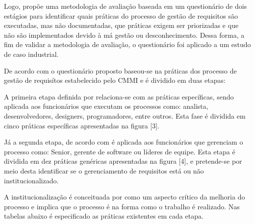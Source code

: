 Logo, \cite{cuevas2004assessment} propõe
uma metodologia de avaliação baseada em um questionário de dois estágios para identificar quais práticas do processo de gestão de requisitos são executadas, mas não documentadas, que práticas exigem ser priorizadas e que não são implementados devido à má gestão ou desconhecimento. Dessa forma, a fim de validar a metodologia de avaliação, o questionário foi
aplicado a um estudo de caso industrial. 

De acordo com \cite{cuevas2004assessment} o questionário proposto baseou-se na práticas dos processo de gestão de requisítos estabelecido pelo
CMMI e é dividido em duas etapas:

A primeira etapa definida por \cite{cuevas2004assessment}
relaciona-se com as práticas específicas, sendo aplicada aos funcionários que
executam os processos como: analista, desenvolvedores,
designers, programadores, entre outros. Esta fase é dividida em
cinco práticas específicas apresentadas na figura [3].

Já a segunda etapa, de acordo com \cite{cuevas2004assessment} é aplicada aos funcionários
que gerenciam o processo como: Senior,
gerente de software ou líderes de equipe.
Esta etapa é dividida em dez práticas genéricas apresentadas na figura [4], e
pretende-se por meio desta identificar se o gerenciamento de requisitos está ou não institucionalizado.

A institucionalização é conceituada por \cite{cuevas2004assessment} como um aspecto crítico da
melhoria do processo e implica que o processo é
na forma como o trabalho é realizado. Nas tabelas abaixo é especificado as práticas existentes em cada etapa.

